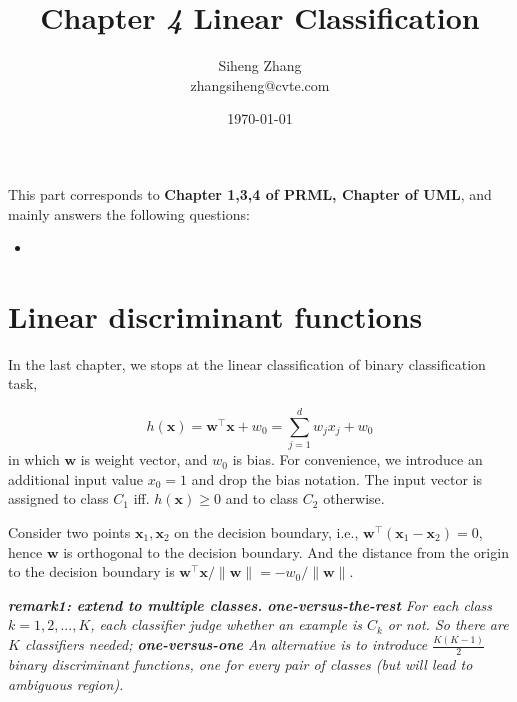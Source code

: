 \documentclass{article}
\author{Siheng Zhang\\zhangsiheng@cvte.com}
\title{Chapter \textbf{\textit{4}} Linear Classification}
\date{\today}
\begin{document}
\maketitle  

This part corresponds to \textbf{Chapter 1,3,4 of PRML, Chapter of UML}, and mainly answers the following questions:

\begin{itemize}
\item 
\end{itemize}

\tableofcontents
\newpage

\section{Linear discriminant functions}
	In the last chapter, we stops at the linear classification of binary classification task,
	
	\begin{equation}
	h(\mathbf{x})=\mathbf{w}^\top \mathbf{x} + w_0 = \sum_{j=1}^d w_j x_j + w_0
	\label{eq:linear}
	\end{equation}
in which $\mathbf{w}$ is weight vector, and $w_0$ is bias. For convenience, we introduce an additional input value $x_0 = 1$ and drop the bias notation. The input vector is assigned to class $C_1$ iff. $h(\mathbf{x})\geq 0$ and to class $C_2$ otherwise.

	Consider two points $\mathbf{x}_1,\mathbf{x}_2$ on the decision boundary, i.e., $\mathbf{w}^\top (\mathbf{x}_1 - \mathbf{x}_2) = 0$, hence $\mathbf{w}$ is orthogonal to the decision boundary. And the distance from the origin to the decision boundary is $\mathbf{w}^\top \mathbf{x} / \|\mathbf{w}\|=-w_0/\|\mathbf{w}\|$.
	
	\begin{framed}
	\begin{scriptsize}
	\begin{spacing}{1.2}
	\noindent\textit{\textbf{remark1: extend to multiple classes.}  \textbf{one-versus-the-rest} For each class $k=1,2,...,K$, each classifier judge whether an example is $C_k$ or not. So there are $K$ classifiers needed;  \textbf{one-versus-one} An alternative is to introduce $\frac{K(K-1)}{2}$ binary discriminant functions, one for every pair of classes (but will lead to ambiguous region).}
	\end{spacing}
	\end{scriptsize}
	\end{framed}
		
\end{document}
